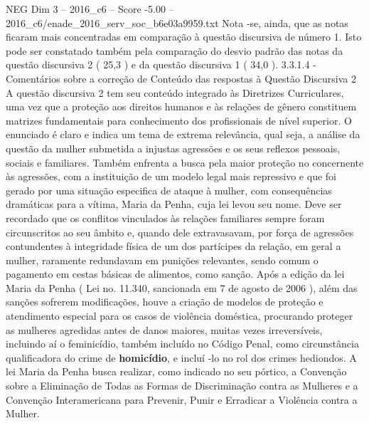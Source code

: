 \begin{textsample}{NEG Dim 3 – 2016\_c6 – Score -5.00 – 2016\_c6/enade\_2016\_serv\_soc\_b6e03a9959.txt}
Nota -se, ainda, que as notas ficaram mais concentradas em comparação à questão discursiva de número 1.
Isto pode ser constatado também pela comparação do desvio padrão das notas da questão discursiva 2 ( 25,3 ) e da questão discursiva 1 ( 34,0 ). 3.3.1.4 - Comentários sobre a correção de Conteúdo das respostas à Questão Discursiva 2 A questão discursiva 2 tem seu conteúdo integrado às Diretrizes Curriculares, uma vez que a proteção aos direitos humanos e às relações de gênero constituem matrizes fundamentais para conhecimento dos profissionais de nível superior.
O enunciado é claro e indica um tema de extrema relevância, qual seja, a análise da questão da mulher submetida a injustas agressões e os seus reflexos pessoais, sociais e familiares.
Também enfrenta a busca pela maior proteção no concernente às agressões, com a instituição de um modelo legal mais repressivo e que foi gerado por uma situação especifica de ataque à mulher, com consequências dramáticas para a vítima, Maria da Penha, cuja lei levou seu nome.
Deve ser recordado que os conflitos vinculados às relações familiares sempre foram circunscritos ao seu âmbito e, quando dele extravasavam, por força de agressões contundentes à integridade física de um dos partícipes da relação, em geral a mulher, raramente redundavam em punições relevantes, sendo comum o pagamento em cestas básicas de alimentos, como sanção.
Após a edição da lei Maria da Penha ( Lei no. 11.340, sancionada em 7 de agosto de 2006 ), além das sanções sofrerem modificações, houve a criação de modelos de proteção e atendimento especial para os casos de violência doméstica, procurando proteger as mulheres agredidas antes de danos maiores, muitas vezes irreversíveis, incluindo aí o feminicídio, também incluído no Código Penal, como circunstância qualificadora do crime de \textbf{homicídio}, e incluí -lo no rol dos crimes hediondos.
A lei Maria da Penha busca realizar, como indicado no seu pórtico, a Convenção sobre a Eliminação de Todas as Formas de Discriminação contra as Mulheres e a Convenção Interamericana para Prevenir, Punir e Erradicar a Violência contra a Mulher.

\end{textsample}
